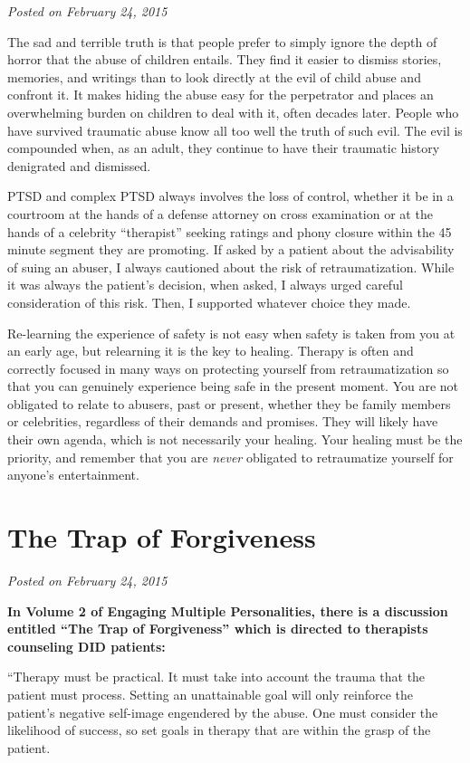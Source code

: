 \documentclass[]{book}
\begin{document}
\emph{Posted on February 24, 2015}

The sad and terrible truth is that people prefer to simply ignore the depth of horror that the abuse of children entails. They find it easier to dismiss stories, memories, and writings than to look directly at the evil of child abuse and confront it. It makes hiding the abuse easy for the perpetrator and places an overwhelming burden on children to deal with it, often decades later. People who have survived traumatic abuse know all too well the truth of such evil. The evil is compounded when, as an adult, they continue to have their traumatic history denigrated and dismissed.

PTSD and complex PTSD always involves the loss of control, whether it be in a courtroom at the hands of a defense attorney on cross examination or at the hands of a celebrity ``therapist'' seeking ratings and phony closure within the 45 minute segment they are promoting. If asked by a patient about the advisability of suing an abuser, I always cautioned about the risk of retraumatization. While it was always the patient's decision, when asked, I always urged careful consideration of this risk. Then, I supported whatever choice they made.

Re-learning the experience of safety is not easy when safety is taken from you at an early age, but relearning it is the key to healing. Therapy is often and correctly focused in many ways on protecting yourself from retraumatization so that you can genuinely experience being safe in the present moment. You are not obligated to relate to abusers, past or present, whether they be family members or celebrities, regardless of their demands and promises. They will likely have their own agenda, which is not necessarily your healing. Your healing must be the priority, and remember that you are \emph{never} obligated to retraumatize yourself for anyone's entertainment.

\hypertarget{the-trap-of-forgiveness}{%
\section{The Trap of Forgiveness}\label{the-trap-of-forgiveness}}

\emph{Posted on February 24, 2015}

\textbf{In Volume 2 of Engaging Multiple Personalities, there is a discussion entitled ``The Trap of Forgiveness'' which is directed to therapists counseling DID patients:}

``Therapy must be practical. It must take into account the trauma that the patient must process. Setting an unattainable goal will only reinforce the patient's negative self-image engendered by the abuse. One must consider the likelihood of success, so set goals in therapy that are within the grasp of the patient.
\end{document}
